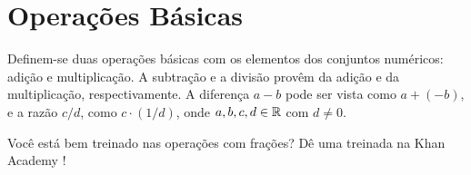 \section{Operações Básicas}

Definem-se duas operações básicas com os elementos dos conjuntos numéricos: adição e multiplicação. A subtração e a divisão provêm da adição e da multiplicação, respectivamente. A diferença $a-b$ pode ser vista como $a+(-b)$, e a razão $c/d$, como $c \cdot (1/d)$, onde $a,b,c,d \in \mathbb{R}$ com $d \ne 0$.

Você está bem treinado nas operações com frações? Dê uma treinada na Khan Academy !
